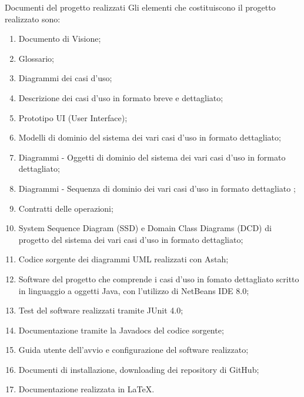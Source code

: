  \begin{frame} [allowframebreaks] {Documenti del progetto realizzati }
   Gli elementi che costituiscono il progetto realizzato sono:
   \begin{enumerate} 
     \item Documento di Visione;
     \item Glossario;
     \item Diagrammi dei casi d'uso;
     \item Descrizione dei casi d'uso in formato breve e dettagliato;
     \item Prototipo UI (User Interface);
     \item Modelli di dominio del sistema dei vari casi d'uso in formato dettagliato;
     \item Diagrammi - Oggetti di dominio del sistema dei vari casi d'uso in formato dettagliato;
     \item Diagrammi - Sequenza di dominio dei vari casi d'uso in formato dettagliato ;
     \item Contratti delle operazioni;
     \item System Sequence Diagram (SSD) e Domain Class Diagrams (DCD) di progetto del sistema dei vari casi d'uso in formato dettagliato;
     \item Codice sorgente dei diagrammi UML realizzati con Astah;
     \item Software del progetto che comprende i casi d'uso in fomato dettagliato scritto in linguaggio a oggetti Java, 
           con l'utilizzo di NetBeans IDE 8.0;
     \item Test del software realizzati tramite JUnit 4.0; 
     \item Documentazione tramite la Javadocs del codice sorgente; 
     \item Guida utente dell'avvio e configurazione del software realizzato;
     \item Documenti di installazione, downloading dei repository di GitHub;
     \item Documentazione realizzata in \LaTeX.
   \end{enumerate}
 \end{frame}
